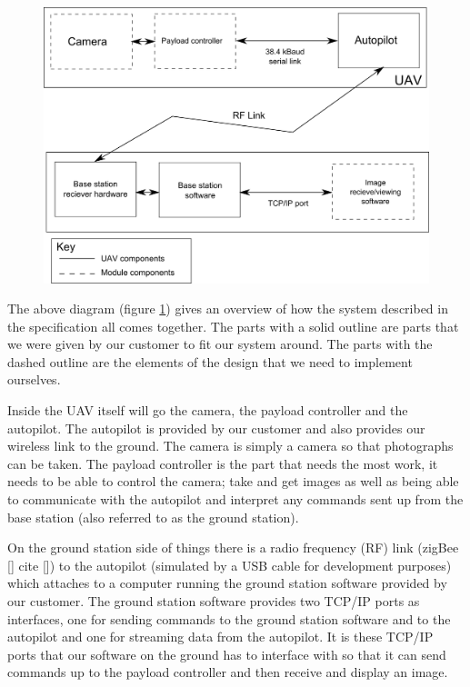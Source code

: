 \begin{figure}[H]
        \centering
        \includegraphics[width=1.00\textwidth]{figures/spec_block_diagram_2.png}
        \label{fig:block1}
\end{figure}

The above diagram (figure \ref{fig:block1}) gives an overview of how the system described in the specification all comes together. The parts with a solid outline are parts that we were given by our customer to fit our system around. The parts with the dashed outline are the elements of the design that we need to implement ourselves.

Inside the UAV itself will go the camera, the payload controller and the autopilot. The autopilot is provided by our customer and also provides our wireless link to the ground. The camera is simply a camera so that photographs can be taken. The payload controller is the part that needs the most work, it needs to be able to control the camera; take and get images as well as being able to communicate with the autopilot and interpret any commands sent up from the base station (also referred to as the ground station).

On the ground station side of things there is a radio frequency (RF) link (zigBee [] cite []) to the autopilot (simulated by a USB cable for development purposes) which attaches to a computer running the ground station software provided by our customer. The ground station software provides two TCP/IP ports as interfaces, one for sending commands to the ground station software and to the autopilot and one for streaming data from the autopilot. It is these TCP/IP ports that our software on the ground has to interface with so that it can send commands up to the payload controller and then receive and display an image.

